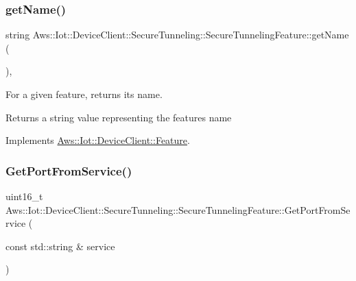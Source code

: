 \subsubsection{\texorpdfstring{get\+Name()}{getName()}}
{\footnotesize\ttfamily string Aws\+::\+Iot\+::\+Device\+Client\+::\+Secure\+Tunneling\+::\+Secure\+Tunneling\+Feature\+::get\+Name (\begin{DoxyParamCaption}{ }\end{DoxyParamCaption})\hspace{0.3cm}{\ttfamily [override]}, {\ttfamily [virtual]}}



For a given feature, returns its name. 

\begin{DoxyReturn}{Returns}
a string value representing the feature\textquotesingle{}s name 
\end{DoxyReturn}


Implements \hyperlink{class_aws_1_1_iot_1_1_device_client_1_1_feature_a7f56b81457898d67ddc1942e57e3c0d5}{Aws\+::\+Iot\+::\+Device\+Client\+::\+Feature}.

\mbox{\label{class_aws_1_1_iot_1_1_device_client_1_1_secure_tunneling_1_1_secure_tunneling_feature_af9e304cd7e3eb06cd2358b3e9fe838c0}} 
\subsubsection{\texorpdfstring{Get\+Port\+From\+Service()}{GetPortFromService()}}
{\footnotesize\ttfamily uint16\+\_\+t Aws\+::\+Iot\+::\+Device\+Client\+::\+Secure\+Tunneling\+::\+Secure\+Tunneling\+Feature\+::\+Get\+Port\+From\+Service (\begin{DoxyParamCaption}\item[{const std\+::string \&}]{service }\end{DoxyParamCaption})\hspace{0.3cm}{\ttfamily [static]}}




